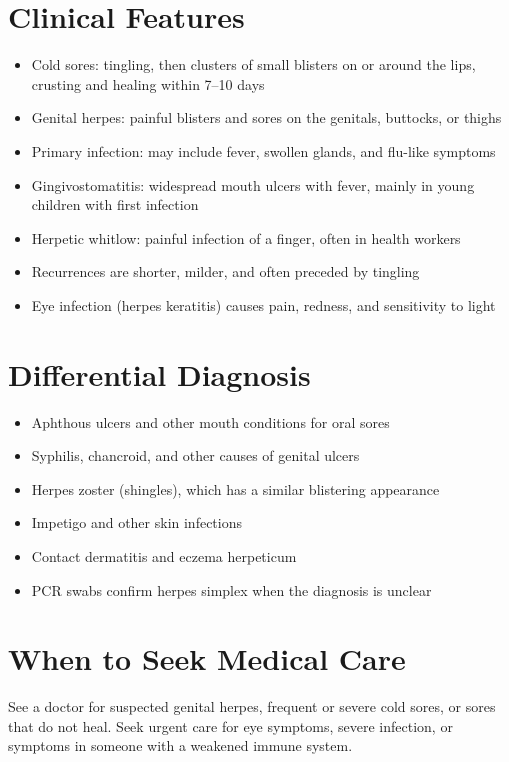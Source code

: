 \section*{Clinical Features}
\begin{itemize}
    \item Cold sores: tingling, then clusters of small blisters on or around the lips, crusting and healing within 7--10 days
    \item Genital herpes: painful blisters and sores on the genitals, buttocks, or thighs
    \item Primary infection: may include fever, swollen glands, and flu-like symptoms
    \item Gingivostomatitis: widespread mouth ulcers with fever, mainly in young children with first infection
    \item Herpetic whitlow: painful infection of a finger, often in health workers
    \item Recurrences are shorter, milder, and often preceded by tingling
    \item Eye infection (herpes keratitis) causes pain, redness, and sensitivity to light
\end{itemize}

\section*{Differential Diagnosis}
\begin{itemize}
    \item Aphthous ulcers and other mouth conditions for oral sores
    \item Syphilis, chancroid, and other causes of genital ulcers
    \item Herpes zoster (shingles), which has a similar blistering appearance
    \item Impetigo and other skin infections
    \item Contact dermatitis and eczema herpeticum
    \item PCR swabs confirm herpes simplex when the diagnosis is unclear
\end{itemize}

\section*{When to Seek Medical Care}
See a doctor for suspected genital herpes, frequent or severe cold sores, or sores that do not heal. Seek urgent care for eye symptoms, severe infection, or symptoms in someone with a weakened immune system.

